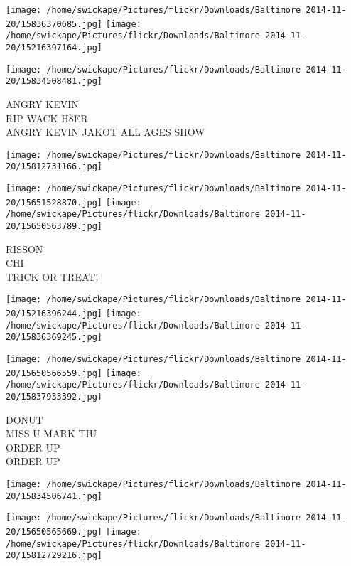 \documentclass[10pt,letterpaper]{article}
\begin{document}
\texttt{[image: /home/swickape/Pictures/flickr/Downloads/Baltimore 2014-11-20/15836370685.jpg]}
\texttt{[image: /home/swickape/Pictures/flickr/Downloads/Baltimore 2014-11-20/15216397164.jpg]}

\texttt{[image: /home/swickape/Pictures/flickr/Downloads/Baltimore 2014-11-20/15834508481.jpg]}

ANGRY KEVIN\\
RIP WACK H8ER\\
ANGRY KEVIN JAKOT ALL AGES SHOW\\
\pagebreak

\texttt{[image: /home/swickape/Pictures/flickr/Downloads/Baltimore 2014-11-20/15812731166.jpg]}

\vspace{0.25in}
\texttt{[image: /home/swickape/Pictures/flickr/Downloads/Baltimore 2014-11-20/15651528870.jpg]}
\texttt{[image: /home/swickape/Pictures/flickr/Downloads/Baltimore 2014-11-20/15650563789.jpg]}

RISSON\\
CHI\\
TRICK OR TREAT!\\
\pagebreak

\texttt{[image: /home/swickape/Pictures/flickr/Downloads/Baltimore 2014-11-20/15216396244.jpg]}
\texttt{[image: /home/swickape/Pictures/flickr/Downloads/Baltimore 2014-11-20/15836369245.jpg]}

\texttt{[image: /home/swickape/Pictures/flickr/Downloads/Baltimore 2014-11-20/15650566559.jpg]}
\texttt{[image: /home/swickape/Pictures/flickr/Downloads/Baltimore 2014-11-20/15837933392.jpg]}

DONUT\\
MISS U MARK TIU\\
ORDER UP\\
ORDER UP\\
\pagebreak

\texttt{[image: /home/swickape/Pictures/flickr/Downloads/Baltimore 2014-11-20/15834506741.jpg]}

\vspace{0.25in}
\texttt{[image: /home/swickape/Pictures/flickr/Downloads/Baltimore 2014-11-20/15650565669.jpg]}
\texttt{[image: /home/swickape/Pictures/flickr/Downloads/Baltimore 2014-11-20/15812729216.jpg]}
\end{document}
